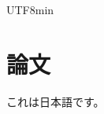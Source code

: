 \documentclass[a4paper,11pt]{article}
\begin{document}
\begin{CJK}{UTF8}{min}
\section{論文}
これは日本語です。
\end{CJK}
\end{document}
